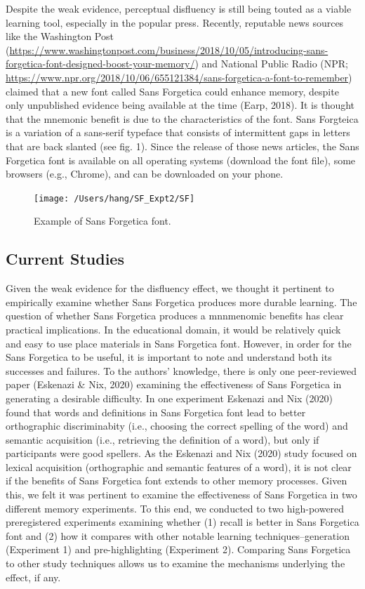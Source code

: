 \documentclass[english,doc]{apa6}
\begin{document}
Despite the weak evidence, perceptual disfluency is still being touted as a viable learning tool, especially in the popular press. Recently, reputable news sources like the Washington Post (\url{https://www.washingtonpost.com/business/2018/10/05/introducing-sans-forgetica-font-designed-boost-your-memory/}) and National Public Radio (NPR; \url{https://www.npr.org/2018/10/06/655121384/sans-forgetica-a-font-to-remember}) claimed that a new font called Sans Forgetica could enhance memory, despite only unpublished evidence being available at the time (Earp, 2018). It is thought that the mnemonic benefit is due to the characteristics of the font. Sans Forgteica is a variation of a sans-serif typeface that consists of intermittent gaps in letters that are back slanted (see fig. 1). Since the release of those news articles, the Sans Forgetica font is available on all operating systems (download the font file), some browsers (e.g., Chrome), and can be downloaded on your phone.

\begin{figure}
\texttt{[image: /Users/hang/SF\_Expt2/SF]} \caption{Example of Sans Forgetica font. }\label{fig:unnamed-chunk-1}
\end{figure}

\hypertarget{current-studies}{%
\subsection{Current Studies}\label{current-studies}}

Given the weak evidence for the disfluency effect, we thought it pertinent to empirically examine whether Sans Forgetica produces more durable learning. The question of whether Sans Forgetica produces a mnnmenomic benefits has clear practical implications. In the educational domain, it would be relatively quick and easy to use place materials in Sans Forgetica font. However, in order for the Sans Forgetica to be useful, it is important to note and understand both its successes and failures. To the authors' knowledge, there is only one peer-reviewed paper (Eskenazi \& Nix, 2020) examining the effectiveness of Sans Forgetica in generating a desirable difficulty. In one experiment Eskenazi and Nix (2020) found that words and definitions in Sans Forgetica font lead to better orthographic discriminabity (i.e., choosing the correct spelling of the word) and semantic acquisition (i.e., retrieving the definition of a word), but only if participants were good spellers. As the Eskenazi and Nix (2020) study focused on lexical acquisition (orthographic and semantic features of a word), it is not clear if the benefits of Sans Forgetica font extends to other memory processes. Given this, we felt it was pertinent to examine the effectiveness of Sans Forgetica in two different memory experiments. To this end, we conducted to two high-powered preregistered experiments examining whether (1) recall is better in Sans Forgetica font and (2) how it compares with other notable learning techniques--generation (Experiment 1) and pre-highlighting (Experiment 2). Comparing Sans Forgetica to other study techniques allows us to examine the mechanisms underlying the effect, if any.
\end{document}
